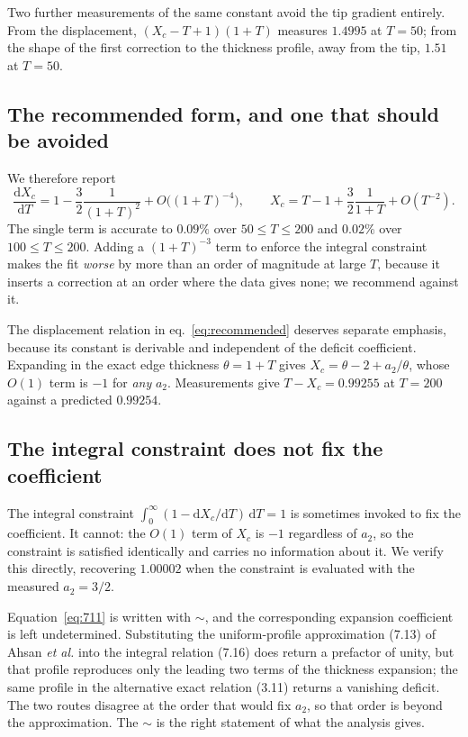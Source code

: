 \documentclass[11pt,a4paper]{article}
\newcommand{\Xc}{X_{c}}
\begin{document}
Two further measurements of the same constant avoid the tip gradient entirely.
From the displacement, $(\Xc - T + 1)(1+T)$ measures $1.4995$ at $T=50$; from
the shape of the first correction to the thickness profile, away from the tip,
$1.51$ at $T=50$.

\subsection{The recommended form, and one that should be avoided}

We therefore report
%
\begin{equation}
  \frac{\mathrm{d}\Xc}{\mathrm{d}T}
    = 1 - \frac{3}{2}\frac{1}{(1+T)^{2}} + O\bigl((1+T)^{-4}\bigr),
  \qquad
  \Xc = T - 1 + \frac{3}{2}\frac{1}{1+T} + O(T^{-2}).
  \label{eq:recommended}
\end{equation}
%
The single term is accurate to $0.09\%$ over $50 \le T \le 200$ and $0.02\%$
over $100 \le T \le 200$. Adding a $(1+T)^{-3}$ term to enforce the integral
constraint makes the fit \emph{worse} by more than an order of magnitude at
large $T$, because it inserts a correction at an order where the data gives
none; we recommend against it.

The displacement relation in eq.~\eqref{eq:recommended} deserves separate
emphasis, because its constant is derivable and independent of the deficit
coefficient. Expanding in the exact edge thickness $\theta = 1+T$ gives
$\Xc = \theta - 2 + a_2/\theta$, whose $O(1)$ term is $-1$ for \emph{any}
$a_2$. Measurements give $T - \Xc = 0.99255$ at $T = 200$ against a predicted
$0.99254$.

\subsection{The integral constraint does not fix the coefficient}

The integral constraint $\int_0^{\infty}(1 - \mathrm{d}\Xc/\mathrm{d}T)\,
\mathrm{d}T = 1$ is sometimes invoked to fix the coefficient. It cannot: the
$O(1)$ term of $\Xc$ is $-1$ regardless of $a_2$, so the constraint is satisfied
identically and carries no information about it. We verify this directly,
recovering $1.00002$ when the constraint is evaluated with the measured
$a_2 = 3/2$.

Equation~\eqref{eq:711} is written with $\sim$, and the corresponding expansion
coefficient is left undetermined. Substituting the uniform-profile
approximation (7.13) of Ahsan \textit{et al.} \cite{ahsan2025} into the integral relation (7.16)
does return a prefactor of unity, but that profile reproduces only the leading
two terms of the thickness expansion; the same profile in the alternative exact
relation (3.11) returns a vanishing deficit. The two routes disagree at the
order that would fix $a_2$, so that order is beyond the approximation. The
$\sim$ is the right statement of what the analysis gives.
\end{document}
